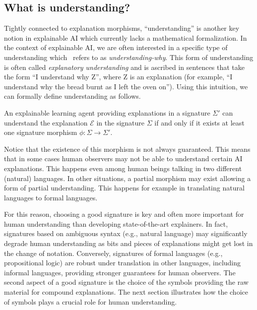 \subsection{What is understanding?}
Tightly connected to explanation morphisms, ``understanding'' is another key notion in explainable AI which currently lacks a mathematical formalization. In the context of explainable AI, we are often interested in a specific type of understanding which~\citet{pritchard2009knowledge} refers to as \textit{understanding-why}. This form of understanding is often called \textit{explanatory understanding} and is ascribed in sentences that take the form ``I understand why Z'', where Z is an explanation (for example, ``I understand why the bread burnt as I left the oven on''). 
Using this intuition, we can formally define understanding as follows.
\begin{definition}[Understanding]
    An explainable learning agent providing explanations in a signature $\Sigma'$ can understand the explanation $\mathcal{E}$ in the signature $\Sigma$ if and only if it exists at least one signature morphism $\phi: \Sigma \rightarrow \Sigma'$.
\end{definition}

\begin{remark}
    Notice that the existence of this morphism is not always guaranteed. This means that in some cases human observers may not be able to understand certain AI explanations. This happens even among human beings talking in two different (natural) languages. In other situations, a partial morphism may exist allowing a form of partial understanding. This happens for example in translating natural languages to formal languages.
\end{remark}

For this reason, choosing a good signature is key and often more important for human understanding than developing state-of-the-art explainers. In fact, signatures based on ambiguous syntax (e.g., natural language) may significantly degrade human understanding as bits and pieces of explanations might get lost in the change of notation. Conversely, signatures of formal languages (e.g., propositional logic) are robust under translation in other languages, including informal languages, providing stronger guarantees for human observers. The second aspect of a good signature is the choice of the symbols providing the raw material for compound explanations. The next section illustrates how the choice of symbols plays a crucial role for human understanding.

